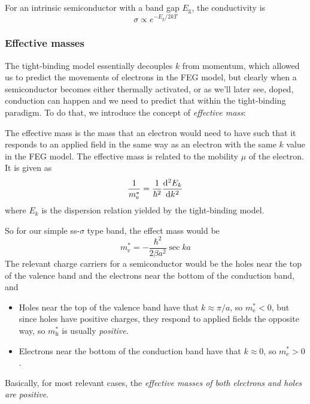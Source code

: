 \begin{thrm}
For an intrinsic semiconductor with a band gap $E_{\mathrm{g}}$, the conductivity is
\begin{equation}
	\sigma\propto e^{-E_{\mathrm{g}}/2kT}
\end{equation}
\end{thrm}
\subsubsection{Effective masses}
The tight-binding model essentially decouples $k$ from momentum, which allowed us to predict the movements of electrons in the FEG model, but clearly when a semiconductor becomes either thermally activated, or as we'll later see, doped, conduction can happen and we need to predict that within the tight-binding paradigm. To do that, we introduce the concept of \emph{effective mass}:
\begin{defi}
The effective mass is the mass that an electron would need to have such that it responds to an applied field in the same way as an electron with the same $k$ value in the FEG model. The effective mass is related to the mobility $\mu$ of the electron. It is given as 
\begin{equation}
	\frac{1}{m_{\mathrm{e}}^*}=\frac{1}{\hbar^2}\diff[2]{E_k}{k}
\end{equation}
where $E_k$ is the dispersion relation yielded by the tight-binding model.
\end{defi}
So for our simple ss-$\sigma$ type band, the effect mass would be
\begin{equation}
	m_{\mathrm{	e}}^*=-\frac{\hbar^2}{2\beta a^2}\sec{ka}
\end{equation}
The relevant charge carriers for a semiconductor would be the holes near the top of the valence band and the electrons near the bottom of the conduction band, and
\begin{itemize}
	\item Holes near the top of the valence band have that $k\approx\pi/a$, so $m_{\mathrm{e}}^*<0$, but since holes have positive charges, they respond to applied fields the opposite way, so $m_{\mathrm{h}}^*$ is usually \emph{positive}.
	\item Electrons near the bottom of the conduction band have that $k\approx0$, so $m_{\mathrm{e}}^*>0$.
\end{itemize}
Basically, for most relevant cases, the \emph{effective masses of both electrons and holes are positive}.